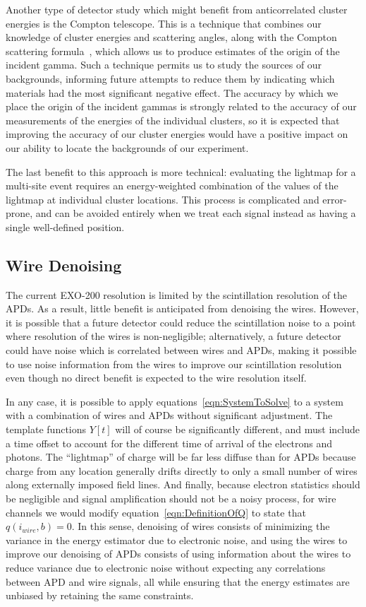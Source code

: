 Another type of detector study which might benefit from anticorrelated cluster energies is the Compton telescope.  This is a technique that combines our knowledge of cluster energies and scattering angles, along with the Compton scattering formula~\cite{ComptonScattering}, which allows us to produce estimates of the origin of the incident gamma.  Such a technique permits us to study the sources of our backgrounds, informing future attempts to reduce them by indicating which materials had the most significant negative effect.  The accuracy by which we place the origin of the incident gammas is strongly related to the accuracy of our measurements of the energies of the individual clusters, so it is expected that improving the accuracy of our cluster energies would have a positive impact on our ability to locate the backgrounds of our experiment.

The last benefit to this approach is more technical: evaluating the lightmap for a multi-site event requires an energy-weighted combination of the values of the lightmap at individual cluster locations.  This process is complicated and error-prone, and can be avoided entirely when we treat each signal instead as having a single well-defined position.

\subsection{Wire Denoising}

The current EXO-200 resolution is limited by the scintillation resolution of the APDs.  As a result, little benefit is anticipated from denoising the wires.  However, it is possible that a future detector could reduce the scintillation noise to a point where resolution of the wires is non-negligible; alternatively, a future detector could have noise which is correlated between wires and APDs, making it possible to use noise information from the wires to improve our scintillation resolution even though no direct benefit is expected to the wire resolution itself.

In any case, it is possible to apply equations~\ref{eqn:SystemToSolve} to a system with a combination of wires and APDs without significant adjustment.  The template functions $Y[t]$ will of course be significantly different, and must include a time offset to account for the different time of arrival of the electrons and photons.  The ``lightmap'' of charge will be far less diffuse than for APDs because charge from any location generally drifts directly to only a small number of wires along externally imposed field lines.  And finally, because electron statistics should be negligible and signal amplification should not be a noisy process, for wire channels we would modify equation~\ref{eqn:DefinitionOfQ} to state that $q(i_{wire}, b) = 0$.  In this sense, denoising of wires consists of minimizing the variance in the energy estimator due to electronic noise, and using the wires to improve our denoising of APDs consists of using information about the wires to reduce variance due to electronic noise without expecting any correlations between APD and wire signals, all while ensuring that the energy estimates are unbiased by retaining the same constraints.
